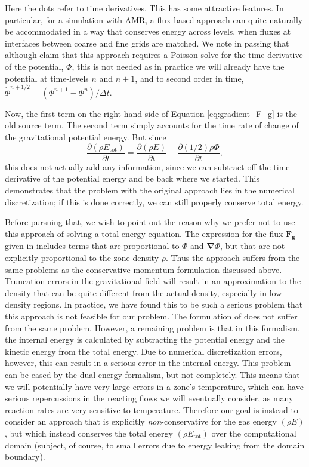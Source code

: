 \documentclass[iop]{emulateapj}
\begin{document}
Here the dots refer to time derivatives. This has some attractive features. 
In particular, for a simulation with AMR, a flux-based approach
can quite naturally be accommodated in a way that conserves energy across levels, when fluxes
at interfaces between coarse and fine grids are matched. We note in passing that although
\citeauthor{jiang:2013} claim that this approach requires a Poisson solve for the time derivative of the potential,
$\dot{\Phi}$, this is not needed as in practice we will already have the potential at time-levels
$n$ and $n+1$, and to second order in time, $\dot{\Phi}^{n+1/2} = (\Phi^{n+1} - \Phi^{n}) / \Delta t.$

Now, the first term on the right-hand side of Equation \ref{eq:gradient_F_g} is the old source term. The second term simply 
accounts for the time rate of change of the gravitational potential energy. But since
\begin{equation}
  \frac{\partial(\rho E_{\text{tot}})}{\partial t} = \frac{\partial (\rho E)}{\partial t} + \frac{\partial (1/2) \rho \Phi}{\partial t},
\end{equation}
this does not actually add any information, since we can subtract off the time derivative 
of the potential energy and be back where we started. This demonstrates that the problem
with the original approach lies in the numerical discretization; if this is done correctly,
we can still properly conserve total energy.

Before pursuing that, we wish to point out the reason why we prefer not to use this 
approach of solving a total energy equation. The expression for the flux $\mathbf{F_g}$
given in \cite{jiang:2013} includes terms that are proportional to $\Phi$ and ${\bm{\nabla}} \Phi$,
but that are not explicitly proportional to the zone density $\rho$. Thus the approach suffers
from the same problems as the conservative momentum formulation discussed above. Truncation errors
in the gravitational field will result in an approximation to the density that can be quite 
different from the actual density, especially in low-density regions. In practice,
we have found this to be such a serious problem that this approach is not feasible for our problem.
The formulation of \cite{marcello:2012} does not suffer from the same problem. However, a 
remaining problem is that in this formalism, the internal energy
is calculated by subtracting the potential energy and the kinetic energy from the 
total energy. Due to numerical discretization errors, however, this can result in a serious 
error in the internal energy. This problem can be eased by the dual energy formalism,
but not completely. This means that we will potentially have very large errors in a 
zone's temperature, which can have serious repercussions in the reacting flows we will eventually consider,
as many reaction rates are very sensitive to temperature. Therefore our goal is instead to consider an approach
that is explicitly \textit{non}-conservative for the gas energy $(\rho E)$, but which
instead conserves the total energy $(\rho E_{\text{tot}})$ over the computational domain 
(subject, of course, to small errors due to energy leaking from the domain boundary).
\end{document}
